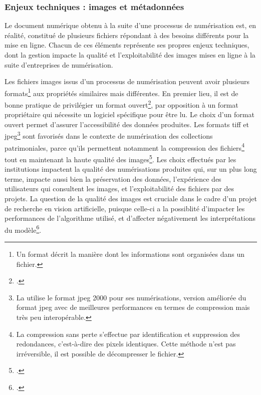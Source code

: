    \subsubsection{Enjeux techniques : images et métadonnées}
	Le document numérique obtenu à la suite d'une processus de numérisation est, en réalité, constitué de plusieurs fichiers répondant à des besoins différents pour la mise en ligne. Chacun de ces éléments représente ses propres enjeux techniques, dont la gestion impacte la qualité et l'exploitabilité des images mises en ligne à la suite d'entreprises de numérisation.
	
	Les fichiers images issus d'un processus de numérisation peuvent avoir plusieurs formats\footnote{Un format décrit la manière dont les informations sont organisées dans un fichier.} aux propriétés similaires mais différentes. En premier lieu, il est de bonne pratique de privilégier un format ouvert\footcite{besseNumerisationMasseVers2019}, par opposition à un format propriétaire qui nécessite un logiciel spécifique pour être lu. Le choix d'un format ouvert permet d'assurer l'accessibilité des données produites. Les formats \acrfull{tiff} et \acrfull{jpeg}\footnote{La \bnf utilise le format \acrshort{jpeg} 2000 pour ses numérisations, version améliorée du format \acrshort{jpeg} avec de meilleures performances en termes de compression mais très peu interopérable.} sont favorisés dans le contexte de numérisation des collections patrimoniales, parce qu'ils permettent notamment la compression des fichiers\footnote{La compression sans perte s'effectue par identification et suppression des redondances, c'est-à-dire des pixels identiques. Cette méthode n'est pas irréversible, il est possible de décompresser le fichier.} tout en maintenant la haute qualité des images\footcite{DigitalImages2020}. Les choix effectués par les institutions impactent la qualité des numérisations produites qui, sur un plus long terme, impacte aussi bien la préservation des données, l'expérience des utilisateurs qui consultent les images, et l'exploitabilité des fichiers par des projets. La question de la qualité des images est cruciale dans le cadre d'un projet de recherche en vision artificielle, puisque celle-ci a la possiblité d'impacter les performances de l'algorithme utilisé, et d'affecter négativement les interprétations du modèle\footcite{bergstromImageQualityComputer2023}.
	
